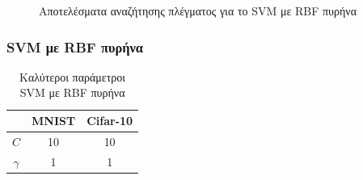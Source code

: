 \documentclass{beamer}
\begin{document}
\begin{frame}
\begin{figure}[H]
    \caption{Αποτελέσματα αναζήτησης πλέγματος για το SVM με RBF πυρήνα}
    \label{fig:cv_rbf}
\end{figure}

\end{frame}

\begin{frame}
\frametitle{SVM με RBF πυρήνα}

\begin{table}[h]
\centering
\begin{tabular}{|c|c|c|}
\hline
         & MNIST & Cifar-10 \\ \hline
$C$      & 10    & 10       \\ \hline
$\gamma$ & 1     & 1        \\ \hline
\end{tabular}
\caption{Καλύτεροι παράμετροι SVM με RBF πυρήνα}
\label{tab:best_rbf}
\end{table}

\end{frame}
\end{document}
